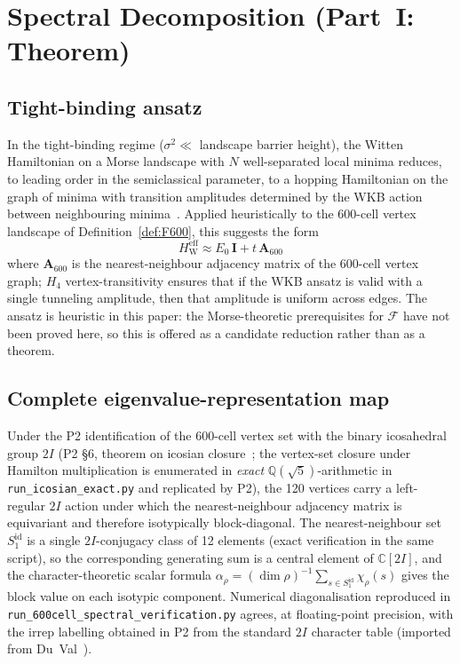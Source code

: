 \documentclass[12pt]{article}
\newcommand{\Fcal}{\mathcal{F}}
\newcommand{\HW}{H_{\mathrm{W}}}
\begin{document}
\section{Spectral Decomposition (Part~I: Theorem)}\label{sec:spectral}

\subsection{Tight-binding ansatz}

In the tight-binding regime ($\sigma^2 \ll$ landscape barrier height), the Witten Hamiltonian on a Morse landscape with $N$ well-separated local minima reduces, to leading order in the semiclassical parameter, to a hopping Hamiltonian on the graph of minima with transition amplitudes determined by the WKB action between neighbouring minima~\citep{WittenMorse, HelfferSjostrand1988}. Applied heuristically to the 600-cell vertex landscape of Definition~\ref{def:F600}, this suggests the form
\begin{equation}
    \HW^{\mathrm{eff}} \approx E_0\,\mathbf{I} + t\,\mathbf{A}_{600}
\end{equation}
where $\mathbf{A}_{600}$ is the nearest-neighbour adjacency matrix of the 600-cell vertex graph; $H_4$ vertex-transitivity ensures that if the WKB ansatz is valid with a single tunneling amplitude, then that amplitude is uniform across edges. The ansatz is heuristic in this paper: the Morse-theoretic prerequisites for $\Fcal$ have not been proved here, so this is offered as a candidate reduction rather than as a theorem.

\subsection{Complete eigenvalue-representation map}

Under the P2 identification of the 600-cell vertex set with the binary icosahedral group $2I$ (P2 \S 6, theorem on icosian closure~\citep{CascadeAlgSubstrate}; the vertex-set closure under Hamilton multiplication is enumerated in \emph{exact} $\mathbb{Q}(\sqrt{5})$-arithmetic in \texttt{run\_icosian\_exact.py} and replicated by P2), the 120 vertices carry a left-regular $2I$ action under which the nearest-neighbour adjacency matrix is equivariant and therefore isotypically block-diagonal. The nearest-neighbour set $S_1^{\mathrm{id}}$ is a single $2I$-conjugacy class of 12 elements (exact verification in the same script), so the corresponding generating sum is a central element of $\mathbb{C}[2I]$, and the character-theoretic scalar formula $\alpha_\rho = (\dim \rho)^{-1} \sum_{s \in S_1^{\mathrm{id}}} \chi_\rho(s)$ gives the block value on each isotypic component. Numerical diagonalisation reproduced in \texttt{run\_600cell\_spectral\_verification.py} agrees, at floating-point precision, with the irrep labelling obtained in P2 from the standard $2I$ character table (imported from Du~Val~\citep[Ch.~3]{DuVal1964}).
\end{document}
